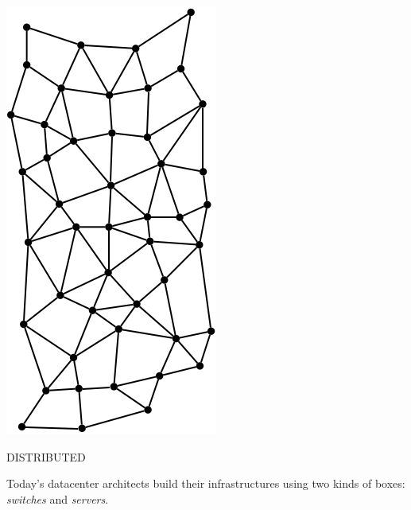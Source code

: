 




\begin{marginfigure}
  \includegraphics[width=0.6\linewidth]{../../FIGURES/Baran-Distributed.png}
  \caption{DISTRIBUTED}
    \vspace{12pt}
\end{marginfigure}
 
Today's datacenter architects build their infrastructures using two kinds of boxes: \emph{switches} and \emph{servers}.

